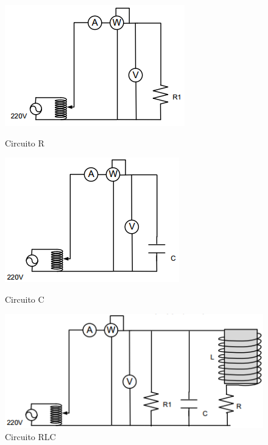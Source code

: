 \documentclass[a4paper]{article}
\begin{document}
\begin{figure}[H]
\centering
\begin{minipage}{.3\textwidth}
  \centering
  \includegraphics[width=.8\linewidth]{Circuito-ejercicio-2A}
  \caption{Circuito R}
\end{minipage}%
\begin{minipage}{.3\textwidth}
  \centering
  \includegraphics[width=.8\linewidth]{Circuito-ejercicio-2B}
  \caption{Circuito C}

\end{minipage}%
\begin{minipage}{.3\textwidth}
  \centering
  \includegraphics[width=.8\linewidth]{Circuito-ejercicio-2C}
  \caption{Circuito RLC}
  \label{fig:2b}
\end{minipage}
\end{figure}
\end{document}

